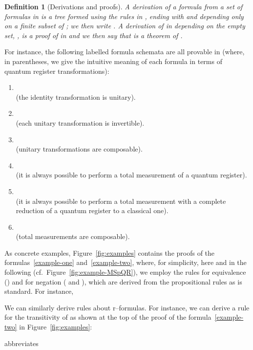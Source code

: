 \documentclass[times, 10pt]{article}
\newtheorem{definition}{Definition}
\begin{document}
\begin{definition}[Derivations and proofs]
  A \emph{derivation} of a formula  from a set of formulas
   in  is a tree formed using the rules in ,
  ending with  and depending only on a finite subset of
  ; we then write .  A derivation of
   in  depending on the empty set, , is
  a \emph{proof} of  in  and we then say that 
  is a theorem of .
\end{definition}

For instance, the following labelled formula schemata are all provable
in  (where, in parentheses, we give the intuitive meaning of
each formula in terms of quantum register transformations):
\begin{enumerate}
\item \\ (the identity transformation is unitary).
\item  \\ (each unitary transformation is invertible).
\item \\ (unitary transformations are composable).
\item  \\
(it is always possible to perform a total measurement of a quantum register).
\item\label{example-one}  \\ 
(it is always possible to perform a total measurement with a complete reduction of a quantum register to a classical one).
\item\label{example-two}
  \\ 
 (total measurements are composable).
\end{enumerate}

As concrete examples, Figure~\ref{fig:examples} contains the proofs of the formulas~\ref{example-one} and~\ref{example-two}, where, for simplicity, here and in the following (cf.~Figure~\ref{fig:example-MSpQR}), we employ the rules for 
equivalence () and for negation ( and ), 
which are derived from the propositional rules as is standard. For instance, 

We can similarly derive rules about r--formulas. For instance, we can derive a rule for the transitivity 
of  as shown at the top of the proof of the formula~\ref{example-two} in Figure~\ref{fig:examples}:

abbreviates
\end{document}
